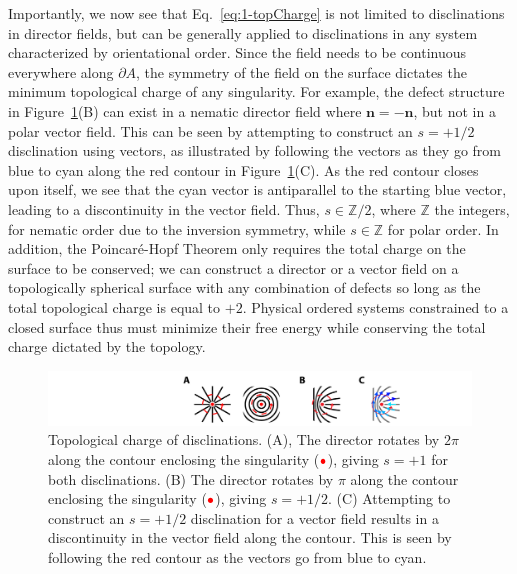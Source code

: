 Importantly, we now see that Eq.~\ref{eq:1-topCharge} is not limited to disclinations in director fields, but can be generally applied to disclinations in any system characterized by orientational order.
Since the field needs to be continuous everywhere along $\partial A$, the symmetry of the field on the surface dictates the minimum topological charge of any singularity.
For example, the defect structure in Figure~\ref{f:1-TopCharge}(B) can exist in a nematic director field where $\mathbf{n} = \mathbf{-n}$, but not in a polar vector field.
This can be seen by attempting to construct an $s = +1/2$ disclination using vectors, as illustrated by following the vectors as they go from blue to cyan along the red contour in Figure~\ref{f:1-TopCharge}(C).
As the red contour closes upon itself, we see that the cyan vector is antiparallel to the starting blue vector, leading to a discontinuity in the vector field.
Thus, $s \in \mathbb{Z}/2$, where $\mathbb{Z}$ the integers, for nematic order due to the inversion symmetry, while $s \in \mathbb{Z}$ for polar order.
In addition, the Poincar\'e-Hopf Theorem only requires the total charge on the surface to be conserved; we can construct a director or a vector field on a topologically spherical surface with any combination of defects so long as the total topological charge is equal to $+2$.
Physical ordered systems constrained to a closed surface thus must minimize their free energy while conserving the total charge dictated by the topology.
\begin{figure}
  \centering
  \includegraphics{figures/C1/Ch1-Figs_TopCharge.png}
  \caption{Topological charge of disclinations.
  (A), The director rotates by $2\pi$ along the contour enclosing the singularity (${\color{red} \bullet}$), giving $s = +1$ for both disclinations.
  (B) The director rotates by $\pi$ along the contour enclosing the singularity (${\color{red} \bullet}$), giving $s = +1/2$.
  (C) Attempting to construct an $s = +1/2$ disclination for a vector field results in a discontinuity in the vector field along the contour.
  This is seen by following the red contour as the vectors go from blue to cyan.}\label{f:1-TopCharge}
\end{figure}

